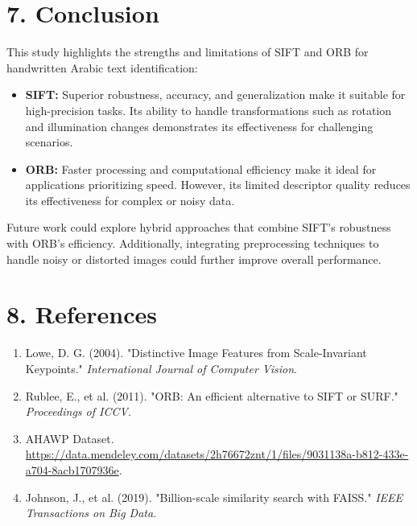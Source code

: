 \documentclass[12pt]{article}
\begin{document}
\section*{7. Conclusion}
This study highlights the strengths and limitations of SIFT and ORB for handwritten Arabic text identification:
\begin{itemize}
    \item \textbf{SIFT:} Superior robustness, accuracy, and generalization make it suitable for high-precision tasks. Its ability to handle transformations such as rotation and illumination changes demonstrates its effectiveness for challenging scenarios.
    \item \textbf{ORB:} Faster processing and computational efficiency make it ideal for applications prioritizing speed. However, its limited descriptor quality reduces its effectiveness for complex or noisy data.
\end{itemize}

Future work could explore hybrid approaches that combine SIFT’s robustness with ORB’s efficiency. Additionally, integrating preprocessing techniques to handle noisy or distorted images could further improve overall performance.

\section*{8. References}
\begin{enumerate}
    \item Lowe, D. G. (2004). "Distinctive Image Features from Scale-Invariant Keypoints." \textit{International Journal of Computer Vision}.
    \item Rublee, E., et al. (2011). "ORB: An efficient alternative to SIFT or SURF." \textit{Proceedings of ICCV}.
    \item AHAWP Dataset. \url{https://data.mendeley.com/datasets/2h76672znt/1/files/9031138a-b812-433e-a704-8acb1707936e}.
    \item Johnson, J., et al. (2019). "Billion-scale similarity search with FAISS." \textit{IEEE Transactions on Big Data}.
\end{enumerate}
\end{document}
